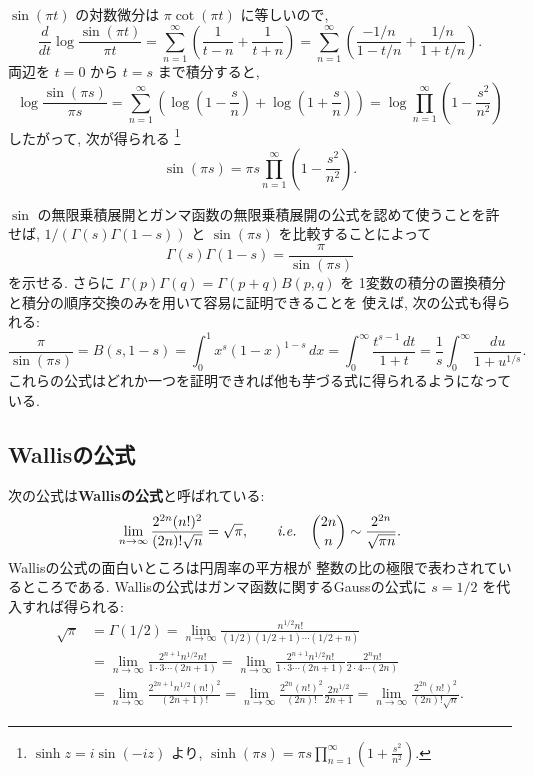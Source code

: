 \documentclass[12pt,twoside]{jarticle}
\theoremstyle{jplain}
\theoremstyle{jplain}
\theoremstyle{jplain}
\numberwithin{theorem}{section}
\numberwithin{equation}{section}
\numberwithin{figure}{section}
\numberwithin{table}{section}
\begin{document}
$\sin(\pi t)$ の対数微分は $\pi\cot(\pi t)$ に等しいので,
\[
\frac{d}{dt}\log\frac{\sin(\pi t)}{\pi t}
=\sum_{n=1}^\infty\left(\frac{1}{t-n}+\frac{1}{t+n}\right)
=\sum_{n=1}^\infty\left( \frac{-1/n}{1-t/n} + \frac{1/n}{1+t/n} \right).
\]
両辺を $t=0$ から $t=s$ まで積分すると,
\[
\log\frac{\sin(\pi s)}{\pi s}
=\sum_{n=1}^\infty
\left(\log\left( 1-\frac{s}{n} \right)+\log\left( 1+\frac{s}{n} \right)\right)
=\log\prod_{n=1}^\infty\left( 1-\frac{s^2}{n^2} \right)
\]
したがって, 次が得られる%
\footnote{$\sinh z=i\sin(-iz)$ より, 
\(\displaystyle
\sinh(\pi s)=\pi s \prod_{n=1}^\infty\left(1+\frac{s^2}{n^2}\right).
\)
}
\[
\sin(\pi s)
=\pi s \prod_{n=1}^\infty\left( 1-\frac{s^2}{n^2} \right).
\]

$\sin$ の無限乗積展開とガンマ函数の無限乗積展開の公式を認めて使うことを許せば, 
$1/(\Gamma(s)\Gamma(1-s))$ と $\sin(\pi s)$ を比較することによって
\[
\Gamma(s)\Gamma(1-s)=\frac{\pi}{\sin(\pi s)}
\]
を示せる. さらに $\Gamma(p)\Gamma(q)=\Gamma(p+q)B(p,q)$ を
1変数の積分の置換積分と積分の順序交換のみを用いて容易に証明できることを
使えば, 次の公式も得られる:
\[
\frac{\pi}{\sin(\pi s)}
=B(s,1-s)
=\int_0^1x^s(1-x)^{1-s}\,dx
=\int_0^\infty \frac{t^{s-1}\,dt}{1+t}
=\frac{1}{s}\int_0^\infty\frac{du}{1+u^{1/s}}.
\]
これらの公式はどれか一つを証明できれば他も芋づる式に得られるようになっている.


\subsection{Wallisの公式}
\label{sec:Wallis}

次の公式は{\bf Wallisの公式}と呼ばれている:
\[
\lim_{n\to\infty}\frac{2^{2n}(n!)^2}{(2n)!\sqrt{n}}
=\sqrt{\pi},
\qquad
\text{\it i.e.}\quad
\binom{2n}{n}\sim\frac{2^{2n}}{\sqrt{\pi n}}.
\]
Wallisの公式の面白いところは円周率の平方根が
整数の比の極限で表わされているところである.
Wallisの公式はガンマ函数に関するGaussの公式に $s=1/2$ を代入すれば得られる:
\begin{align*}
\sqrt{\pi}&
=\Gamma(1/2)
=\lim_{n\to\infty}\frac{n^{1/2} n!}{(1/2)(1/2+1)\cdots(1/2+n)}
\\ &
=\lim_{n\to\infty}
\frac{2^{n+1}n^{1/2}n!}{1\cdot3\cdots(2n+1)}
=\lim_{n\to\infty}
\frac{2^{n+1}n^{1/2}n!}{1\cdot3\cdots(2n+1)}\frac{2^n n!}{2\cdot4\cdots(2n)}
\\ &
=\lim_{n\to\infty}
\frac{2^{2n+1}n^{1/2}(n!)^2}{(2n+1)!}
=\lim_{n\to\infty}
\frac{2^{2n}(n!)^2}{(2n)!}\frac{2n^{1/2}}{2n+1}
=\lim_{n\to\infty}
\frac{2^{2n}(n!)^2}{(2n)!\sqrt{n}}.
\end{align*}
\end{document}
